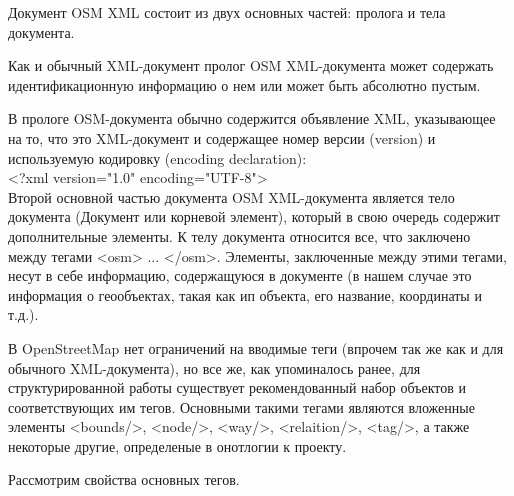 \documentclass[12pt,a4paper,oneside]{article} %
\begin{document}
Документ OSM XML состоит из двух основных частей: пролога и тела \linebreak
документа.

Как и обычный XML-документ пролог OSM XML-документа может \linebreak
содержать идентификационную информацию о нем или может быть\linebreak
абсолютно пустым.

В прологе OSM-документа обычно содержится объявление XML, \linebreak
указывающее на то, что это XML-документ и содержащее номер \linebreak
версии (version) и используемую кодировку (encoding declaration):
\\[10pt]
<?xml version="1.0" encoding="UTF-8">
\\[10pt]
Второй основной частью документа OSM XML-документа является тело \linebreak
документа (Документ или корневой элемент), который в свою очередь \linebreak
содержит дополнительные элементы. К телу документа относится все, \linebreak
что заключено между тегами <osm> ... </osm>. Элементы, заключенные \linebreak
между этими тегами, несут в себе информацию, содержащуюся в \linebreak
документе (в нашем случае это информация о геообъектах, такая как\linebreak
 ип объекта, его название, координаты и т.д.).

В OpenStreetMap нет ограничений на вводимые теги (впрочем так же как \linebreak
и для обычного XML-документа), но все же, как упоминалось ранее, для \linebreak
структурированной работы существует рекомендованный набор объектов и \linebreak
соответствующих им тегов. Основными такими тегами являются вложенные \linebreak
элементы <bounds/>, <node/>, <way/>, <relaition/>, <tag/>, а также \linebreak
некоторые другие, определеные в онотлогии к проекту.

Рассмотрим свойства основных тегов.
\end{document}
